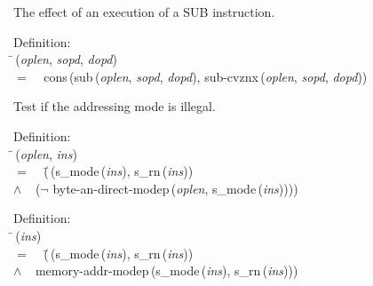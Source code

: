 The effect of an execution of a SUB instruction.
\begin{tabbing}{\sc Definition}: \\  
\=\,({\it{oplen\/}}, {\it{sopd\/}}, {\it{dopd\/}}) \\ 
$=$$\;\;\;\;${\rm{cons}}\,({\rm{sub}}\,({\it{oplen\/}}, {\it{sopd\/}}, {\it{dopd\/}}), {\rm{sub-cvznx}}\,({\it{oplen\/}}, {\it{sopd\/}}, {\it{dopd\/}}))\-
\end{tabbing}

 Test if the addressing mode is illegal.
\begin{tabbing}{\sc Definition}: \\  
\=\,({\it{oplen\/}}, {\it{ins\/}}) \\ 
$=$$\;\;\;\;$(\=\,({\rm{s\_mode}}\,({\it{ins\/}}), {\rm{s\_rn}}\,({\it{ins\/}})) \\ 
$\wedge$$\;\;\;\;$($\neg$ {\rm{byte-an-direct-modep}}\,({\it{oplen\/}}, {\rm{s\_mode}}\,({\it{ins\/}}))))\-\-
\end{tabbing}

\begin{tabbing}{\sc Definition}: \\  
\=\,({\it{ins\/}}) \\ 
$=$$\;\;\;\;$(\=\,({\rm{s\_mode}}\,({\it{ins\/}}), {\rm{s\_rn}}\,({\it{ins\/}})) \\ 
$\wedge$$\;\;\;\;${\rm{memory-addr-modep}}\,({\rm{s\_mode}}\,({\it{ins\/}}), {\rm{s\_rn}}\,({\it{ins\/}})))\-\-
\end{tabbing}

